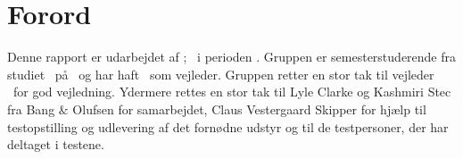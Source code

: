 \chapter*{Forord}
\label{Forord}
Denne rapport er udarbejdet af \groupname; \groupmembers\ i perioden \projectperiod. Gruppen er \semester semesterstuderende fra studiet \studyname\ på \universityname\ og har haft \supervisor\ som vejleder. Gruppen retter en stor tak til vejleder \supervisor\ for god vejledning. Ydermere rettes en stor tak til Lyle Clarke og Kashmiri Stec fra Bang $\&$ Olufsen for samarbejdet, Claus Vestergaard Skipper for hjælp til testopstilling og udlevering af det fornødne udstyr og til de testpersoner, der har deltaget i testene.    

%
